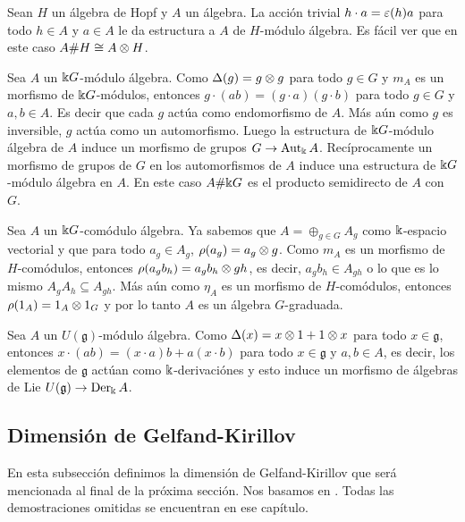 \documentclass[a4paper,oneside,fleqn,11pt,../tesis.tex]{subfiles}
\begin{document}
\begin{example}
	Sean $H$ un álgebra de Hopf y $A$ un álgebra. La acción trivial $h \cdot a = \varepsilon(h) a$ para todo $h \in A$
	y $a \in A$ le da estructura a $A$ de $H$-módulo álgebra. Es fácil ver que en este caso $A\#H \cong A\otimes H$.
\end{example}

\begin{example}
	Sea $A$ un $\Bbbk G$-módulo álgebra. Como $\Delta(g) = g \otimes g$ para todo $g \in G$ y $m_A$ es un morfismo de $\Bbbk G$-módulos,
	entonces $g \cdot (ab) = (g \cdot a)(g \cdot b)$ para todo $g \in G$ y $a,b \in A$.
	Es decir que cada $g$ actúa como endomorfismo de $A$. Más aún como
	$g$ es inversible, $g$ actúa como un automorfismo. Luego la estructura de $\Bbbk G$-módulo álgebra de $A$ induce
	un morfismo de grupos $G \to \operatorname{Aut}_{\Bbbk}A$. Recíprocamente un morfismo de grupos de $G$ en los automorfismos
	de $A$ induce una estructura de $\Bbbk G$-módulo álgebra en $A$. En este caso $A \# \Bbbk G$ es el producto semidirecto
	de $A$ con $G$.
\end{example}

\begin{example}
	Sea $A$ un $\Bbbk G$-comódulo álgebra. Ya sabemos que $A = \oplus_{g \in G} A_g$ como $\Bbbk$-espacio vectorial
	y que para todo $a_g \in A_g$, $\rho(a_g) = a_g \otimes g$. Como $m_A$ es un morfismo de $H$-comódulos, entonces
	$\rho(a_g b_h) = a_g b_h \otimes gh$, es decir, $a_g b_h \in A_{gh}$ o lo que es lo mismo $A_g A_h \subseteq A_{gh}$.
	Más aún como $\eta_A$ es un morfismo de $H$-comódulos, entonces $\rho(1_A) = 1_A \otimes 1_G$ y por lo tanto
	$A$ es un álgebra $G$-graduada. 
\end{example}

\begin{example}
	Sea $A$ un $U(\mathfrak{g})$-módulo álgebra. Como $\Delta(x) = x \otimes 1 + 1 \otimes x$ para todo $x \in \mathfrak{g}$,
	entonces $x\cdot (ab) = (x \cdot a)b + a (x \cdot b)$ para todo $x\in \mathfrak{g}$ y $a, b \in A$, es decir,
	los elementos de $\mathfrak{g}$ actúan como $\Bbbk$-derivaciónes y esto
	induce un morfismo de álgebras de Lie $U(\mathfrak{g}) \to \operatorname{Der}_{\Bbbk}A$.
\end{example}

\subsection{Dimensión de Gelfand-Kirillov}
En esta subsección definimos la dimensión de Gelfand-Kirillov que será mencionada al final de la próxima sección.
Nos basamos en \cite[Capítulo 8]{McR}. Todas las demostraciones omitidas se encuentran en ese capítulo.
\end{document}
